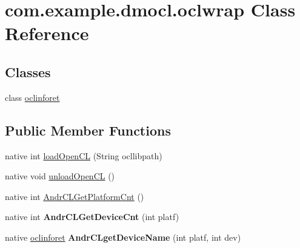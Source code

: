 \hypertarget{classcom_1_1example_1_1dmocl_1_1oclwrap}{}\section{com.\+example.\+dmocl.\+oclwrap Class Reference}
\label{classcom_1_1example_1_1dmocl_1_1oclwrap}
\subsection*{Classes}
\begin{DoxyCompactItemize}
\item 
class \mbox{\hyperlink{classcom_1_1example_1_1dmocl_1_1oclwrap_1_1oclinforet}{oclinforet}}
\end{DoxyCompactItemize}
\subsection*{Public Member Functions}
\begin{DoxyCompactItemize}
\item 
native int \mbox{\hyperlink{classcom_1_1example_1_1dmocl_1_1oclwrap_ac410aa241e771d4b1962636fa9f04e24}{load\+Open\+CL}} (String ocllibpath)
\item 
native void \mbox{\hyperlink{classcom_1_1example_1_1dmocl_1_1oclwrap_aa98cb05829d56c9bdc773eeda8911d2c}{unload\+Open\+CL}} ()
\item 
native int \mbox{\hyperlink{classcom_1_1example_1_1dmocl_1_1oclwrap_ae24bb606cc482ba27e0dbdca97b377ea}{Andr\+C\+L\+Get\+Platform\+Cnt}} ()
\item 
\mbox{\label{classcom_1_1example_1_1dmocl_1_1oclwrap_a32be75820f34934e226d5ab0db569aa7}} 
native int {\bfseries Andr\+C\+L\+Get\+Device\+Cnt} (int platf)
\item 
\mbox{\label{classcom_1_1example_1_1dmocl_1_1oclwrap_aa4f6d9eb5e580ebc687ccd3a518abb2c}} 
native \mbox{\hyperlink{classcom_1_1example_1_1dmocl_1_1oclwrap_1_1oclinforet}{oclinforet}} {\bfseries Andr\+C\+Lget\+Device\+Name} (int platf, int dev)
\end{DoxyCompactItemize}
